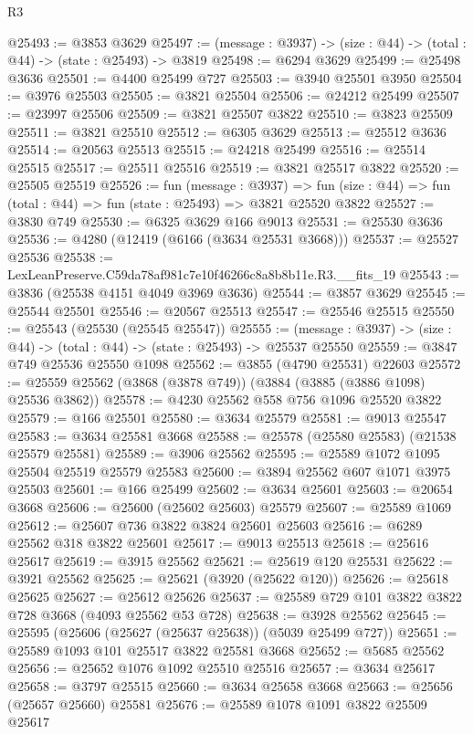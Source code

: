 \begin{lexlean}{R3}
\begin{coremodule}
@25493 := @3853 @3629
@25497 := (message : @3937) -> (size : @44) -> (total : @44) -> (state : @25493) -> @3819
@25498 := @6294 @3629
@25499 := @25498 @3636
@25501 := @4400 @25499 @727
@25503 := @3940 @25501 @3950
@25504 := @3976 @25503
@25505 := @3821 @25504
@25506 := @24212 @25499
@25507 := @23997 @25506
@25509 := @3821 @25507 @3822
@25510 := @3823 @25509
@25511 := @3821 @25510
@25512 := @6305 @3629
@25513 := @25512 @3636
@25514 := @20563 @25513
@25515 := @24218 @25499
@25516 := @25514 @25515
@25517 := @25511 @25516
@25519 := @3821 @25517 @3822
@25520 := @25505 @25519
@25526 := fun (message : @3937) =>
  fun (size : @44) => fun (total : @44) => fun (state : @25493) => @3821 @25520 @3822
@25527 := @3830 @749
@25530 := @6325 @3629 @166 @9013
@25531 := @25530 @3636
@25536 := @4280 (@12419 (@6166 (@3634 @25531 @3668)))
@25537 := @25527 @25536
@25538 := LexLeanPreserve.C59da78af981c7e10f46266c8a8b8b11e.R3.__fits_19
@25543 := @3836 (@25538 @4151 @4049 @3969 @3636)
@25544 := @3857 @3629
@25545 := @25544 @25501
@25546 := @20567 @25513
@25547 := @25546 @25515
@25550 := @25543 (@25530 (@25545 @25547))
@25555 := (message : @3937) -> (size : @44) -> (total : @44) -> (state : @25493) -> @25537 @25550
@25559 := @3847 @749 @25536 @25550 @1098
@25562 := @3855 (@4790 @25531) @22603
@25572 := @25559 @25562 (@3868 (@3878 @749)) (@3884 (@3885 (@3886 @1098) @25536 @3862))
@25578 := @4230 @25562 @558 @756 @1096 @25520 @3822
@25579 := @166 @25501
@25580 := @3634 @25579
@25581 := @9013 @25547
@25583 := @3634 @25581 @3668
@25588 := @25578 (@25580 @25583) (@21538 @25579 @25581)
@25589 := @3906 @25562
@25595 := @25589 @1072 @1095 @25504 @25519 @25579 @25583
@25600 := @3894 @25562 @607 @1071 @3975 @25503
@25601 := @166 @25499
@25602 := @3634 @25601
@25603 := @20654 @3668
@25606 := @25600 (@25602 @25603) @25579
@25607 := @25589 @1069
@25612 := @25607 @736 @3822 @3824 @25601 @25603
@25616 := @6289 @25562 @318 @3822 @25601
@25617 := @9013 @25513
@25618 := @25616 @25617
@25619 := @3915 @25562
@25621 := @25619 @120 @25531
@25622 := @3921 @25562
@25625 := @25621 (@3920 (@25622 @120))
@25626 := @25618 @25625
@25627 := @25612 @25626
@25637 := @25589 @729 @101 @3822 @3822 @728 @3668 (@4093 @25562 @53 @728)
@25638 := @3928 @25562
@25645 := @25595 (@25606 (@25627 (@25637 @25638)) (@5039 @25499 @727))
@25651 := @25589 @1093 @101 @25517 @3822 @25581 @3668
@25652 := @5685 @25562
@25656 := @25652 @1076 @1092 @25510 @25516
@25657 := @3634 @25617
@25658 := @3797 @25515
@25660 := @3634 @25658 @3668
@25663 := @25656 (@25657 @25660) @25581
@25676 := @25589
    @1078
    @1091
    @3822
    @25509
    @25617

\end{coremodule}
\end{lexlean}
